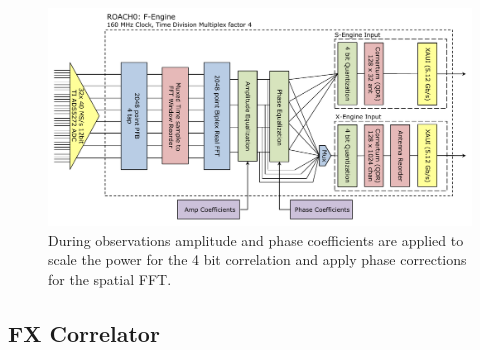 \documentclass[useAMS,macros,usenatbib,onecolumn]{mn2e}
\begin{document}

\begin{figure}
    \centering
    \includegraphics[scale=0.6]{graphics/crop_fengine_block.pdf}
    \caption{During observations amplitude and phase coefficients are applied to scale the power for the 4 bit correlation and apply phase corrections for the spatial FFT.}
    \label{fig:feng_block}
\end{figure}

\subsection{FX Correlator}
\label{correlator}
\end{document}
